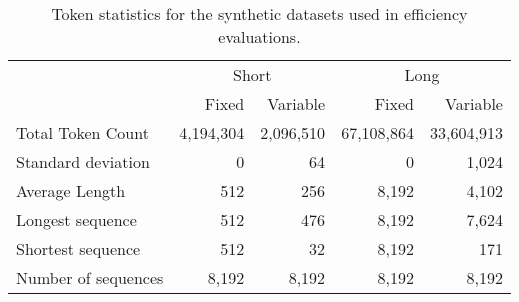 \documentclass[11pt]{article}
\begin{document}
\begin{table*}[!t]
\centering
\begin{tabular}{lrrrr}
\toprule
 & \multicolumn{2}{c}{Short} & \multicolumn{2}{c}{Long} \\
\cmidrule(lr){2-3} \cmidrule(lr){4-5}
& Fixed & Variable & Fixed & Variable \\
\midrule
Total Token Count & 4,194,304 & 2,096,510 & 67,108,864 & 33,604,913 \\
Standard deviation & 0 & 64 & 0 & 1,024 \\
Average Length & 512 & 256 & 8,192 & 4,102 \\
Longest sequence & 512 & 476 & 8,192 & 7,624 \\
Shortest sequence & 512 & 32 & 8,192 & 171 \\
Number of sequences & 8,192 & 8,192 & 8,192 & 8,192 \\
\bottomrule
\end{tabular}
\caption{Token statistics for the synthetic datasets used in efficiency evaluations.}
\label{tab:syntheticdatasets}
\end{table*}
\end{document}
